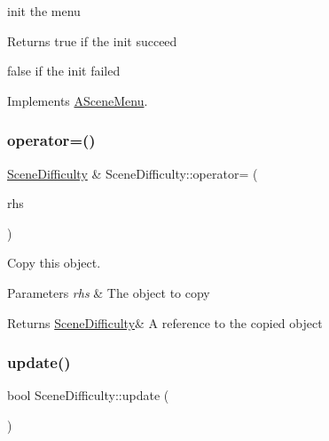 init the menu 

\begin{DoxyReturn}{Returns}
true if the init succeed 

false if the init failed 
\end{DoxyReturn}


Implements \hyperlink{class_a_scene_menu_a78bdee98bd7df224524586a060f9bdec}{A\+Scene\+Menu}.

\mbox{\label{class_scene_difficulty_a89872867aa3b6ae5d58e2b3f1f373a66}} 
\subsubsection{\texorpdfstring{operator=()}{operator=()}}
{\footnotesize\ttfamily \hyperlink{class_scene_difficulty}{Scene\+Difficulty} \& Scene\+Difficulty\+::operator= (\begin{DoxyParamCaption}\item[{\hyperlink{class_scene_difficulty}{Scene\+Difficulty} const \&}]{rhs }\end{DoxyParamCaption})}



Copy this object. 


\begin{DoxyParams}{Parameters}
{\em rhs} & The object to copy \\
\hline
\end{DoxyParams}
\begin{DoxyReturn}{Returns}
\hyperlink{class_scene_difficulty}{Scene\+Difficulty}\& A reference to the copied object 
\end{DoxyReturn}
\mbox{\label{class_scene_difficulty_a2a3d3328b04df7047cc03725a9c5eb3c}} 
\subsubsection{\texorpdfstring{update()}{update()}}
{\footnotesize\ttfamily bool Scene\+Difficulty\+::update (\begin{DoxyParamCaption}{ }\end{DoxyParamCaption})\hspace{0.3cm}{\ttfamily [virtual]}}



